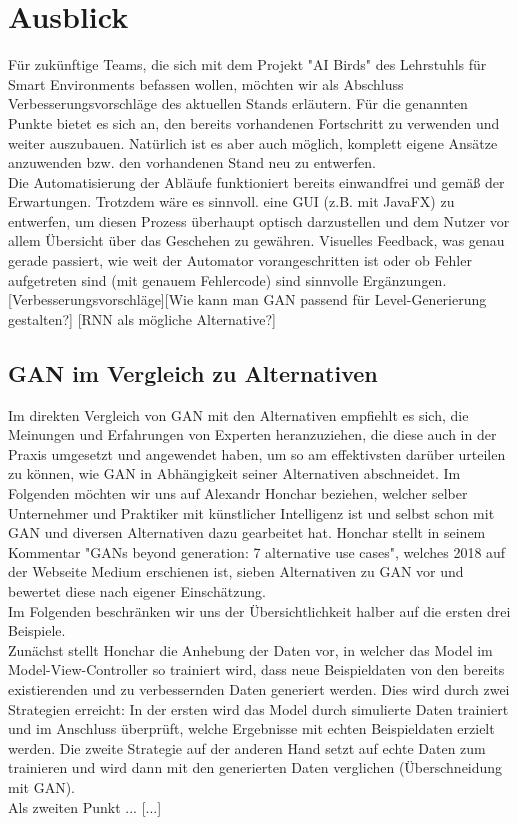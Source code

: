 \section{Ausblick}
Für zukünftige Teams, die sich mit dem Projekt "AI Birds" des Lehrstuhls für Smart Environments befassen wollen, möchten wir als Abschluss Verbesserungsvorschläge des aktuellen Stands erläutern. Für die genannten Punkte bietet es sich an, den bereits vorhandenen Fortschritt zu verwenden und weiter auszubauen. Natürlich ist es aber auch möglich, komplett eigene Ansätze anzuwenden bzw. den vorhandenen Stand neu zu entwerfen. \\ Die Automatisierung der Abläufe funktioniert bereits einwandfrei und gemäß der Erwartungen. Trotzdem wäre es sinnvoll. eine GUI (z.B. mit JavaFX) zu entwerfen, um diesen Prozess überhaupt optisch darzustellen und dem Nutzer vor allem Übersicht über das Geschehen zu gewähren. Visuelles Feedback, was genau gerade passiert, wie weit der Automator vorangeschritten ist oder ob Fehler aufgetreten sind (mit genauem Fehlercode) sind sinnvolle Ergänzungen.
[Verbesserungsvorschläge][Wie kann man GAN passend für Level-Generierung gestalten?] [RNN als mögliche Alternative?]
\subsection{GAN im Vergleich zu Alternativen}
Im direkten Vergleich von GAN mit den Alternativen empfiehlt es sich, die Meinungen und Erfahrungen von Experten heranzuziehen, die diese auch in der Praxis umgesetzt und angewendet haben, um so am effektivsten darüber urteilen zu können, wie GAN in Abhängigkeit seiner Alternativen abschneidet. Im Folgenden möchten wir uns auf Alexandr Honchar beziehen, welcher selber Unternehmer und Praktiker mit künstlicher Intelligenz ist und selbst schon mit GAN und diversen Alternativen dazu gearbeitet hat. Honchar stellt in seinem Kommentar "GANs beyond generation: 7 alternative use cases", welches 2018 auf der Webseite Medium erschienen ist, sieben Alternativen zu GAN vor und bewertet diese nach eigener Einschätzung.\\ Im Folgenden beschränken wir uns der Übersichtlichkeit halber auf die ersten drei Beispiele. \\Zunächst stellt Honchar die Anhebung der Daten vor, in welcher das Model im Model-View-Controller so trainiert wird, dass neue Beispieldaten von den bereits existierenden und zu verbessernden Daten generiert werden. Dies wird durch zwei Strategien erreicht: In der ersten wird das Model durch simulierte Daten trainiert und im Anschluss überprüft, welche Ergebnisse mit echten Beispieldaten erzielt werden. Die zweite Strategie auf der anderen Hand setzt auf echte Daten zum trainieren und wird dann mit den generierten Daten verglichen (Überschneidung mit GAN). \\ Als zweiten Punkt ... [...]